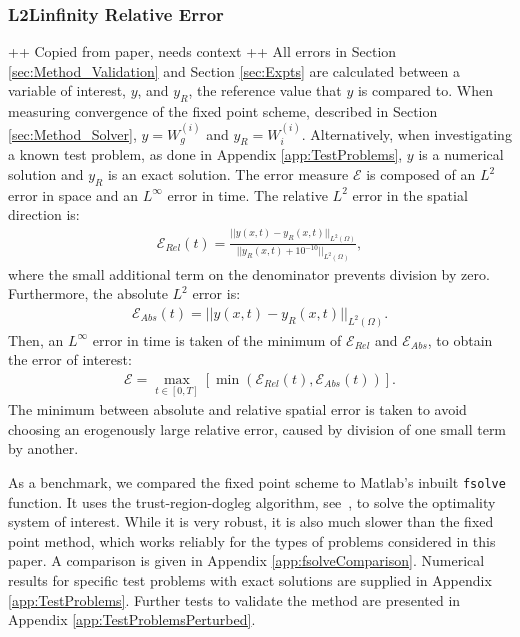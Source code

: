 \documentclass[11pt, a4paper]{article}
\theoremstyle{definition}
\begin{document}
\subsubsection{L2Linfinity Relative Error}
++ Copied from paper, needs context ++
All errors in Section \ref{sec:Method_Validation} and Section \ref{sec:Expts} are calculated between a variable of interest, $y$, and $y_R$, the reference value that $y$ is compared to. When measuring convergence of the fixed point scheme, described in Section \ref{sec:Method_Solver}, $y = W^{(i)}_g$ and $y_R = W^{(i)}_i$. Alternatively, when investigating a known test problem, as done in Appendix \ref{app:TestProblems}, $y$ is a numerical solution and $y_R$ is an exact solution. The error measure $\mathcal{E}$ is composed of an $L^2$ error in space and an $L^\infty$ error in time. The relative $L^2$ error in the spatial direction is:
\begin{align*}
\mathcal{E}_{Rel}(t) = \frac{|| y(x,t) - y_{R}(x,t)||_{L^2(\Omega)} }{||y_R(x,t) + 10^{-10}||_{L^2(\Omega)}},
\end{align*}
where the small additional term on the denominator prevents division by zero.
Furthermore, the absolute $L^2$ error is:
\begin{align*}
\mathcal{E}_{Abs}(t) = || y(x,t) - y_R(x,t)||_{L^2(\Omega)}.
\end{align*}
Then, an $L^\infty$ error in time is taken of the minimum of $\mathcal{E}_{Rel}$ and $\mathcal{E}_{Abs}$, to obtain the error of interest:
\begin{align*}
\mathcal{E} = \max_{t \in [0,T]}\left[\min\left(\mathcal{E}_{Rel}(t), \mathcal{E}_{Abs}(t)\right)\right].
\end{align*}
The minimum between absolute and relative spatial error is taken to avoid choosing an erogenously large relative error, caused by division of one small term by another.

As a benchmark, we compared the fixed point scheme to Matlab's inbuilt \texttt{fsolve} function. It uses the trust-region-dogleg algorithm, see~\cite{Powell1}, to solve the optimality system of interest. While it is very robust, it is also much slower than the fixed point method, which works reliably for the types of problems considered in this paper. A comparison is given in Appendix \ref{app:fsolveComparison}. Numerical results for specific test problems with exact solutions are supplied in Appendix \ref{app:TestProblems}. Further tests to validate the method are presented in Appendix \ref{app:TestProblemsPerturbed}.
\end{document}
